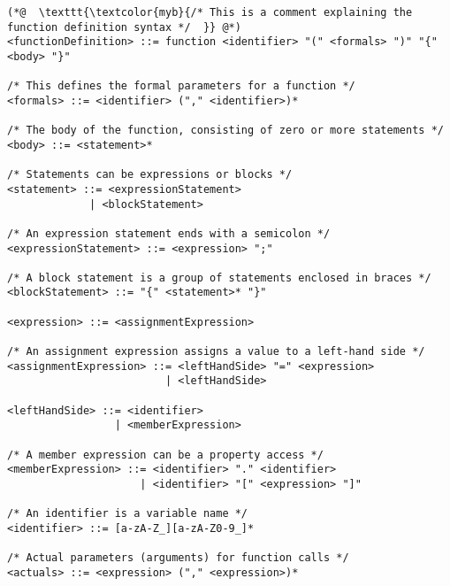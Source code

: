 \documentclass{report}
\begin{document}
\begin{paracol}{2}









\begin{adjustbox}{width=\linewidth}
\begin{lstlisting}
(*@  \texttt{\textcolor{myb}{/* This is a comment explaining the function definition syntax */  }} @*)
<functionDefinition> ::= function <identifier> "(" <formals> ")" "{" <body> "}"

/* This defines the formal parameters for a function */
<formals> ::= <identifier> ("," <identifier>)*

/* The body of the function, consisting of zero or more statements */
<body> ::= <statement>*

/* Statements can be expressions or blocks */
<statement> ::= <expressionStatement>
             | <blockStatement>

/* An expression statement ends with a semicolon */
<expressionStatement> ::= <expression> ";"

/* A block statement is a group of statements enclosed in braces */
<blockStatement> ::= "{" <statement>* "}"

<expression> ::= <assignmentExpression>

/* An assignment expression assigns a value to a left-hand side */
<assignmentExpression> ::= <leftHandSide> "=" <expression>
                         | <leftHandSide>

<leftHandSide> ::= <identifier>
                 | <memberExpression>

/* A member expression can be a property access */
<memberExpression> ::= <identifier> "." <identifier>
                     | <identifier> "[" <expression> "]"

/* An identifier is a variable name */
<identifier> ::= [a-zA-Z_][a-zA-Z0-9_]*

/* Actual parameters (arguments) for function calls */
<actuals> ::= <expression> ("," <expression>)*
\end{lstlisting}

\end{adjustbox}


\switchcolumn

\end{paracol}
\end{document}
